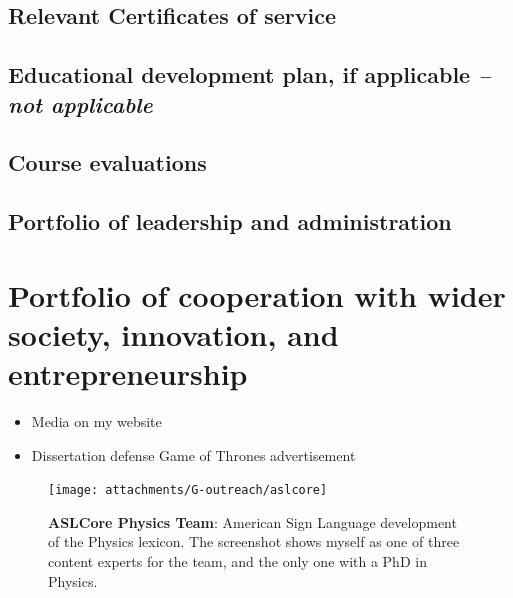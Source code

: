 \section{Relevant Certificates of service \noneyet} \label{sec:relevant-certificates-of-service-noneyet}
\section{Educational development plan, if applicable \normalsize{\textit{-- not applicable}}} \label{sec:educational-development-plan-if-applicable-not-applicable}
\section{Course evaluations} \label{sec:course-evaluations}

\section{Portfolio of leadership and administration} \label{sec:portfolio-of-leadership-and-administration}

\setcounter{chapter}{6}
\chapter{Portfolio of cooperation with wider society, innovation, and entrepreneurship}
\begin{itemize}
	\item Media on my website
	\item Dissertation defense Game of Thrones advertisement
\end{itemize}


\begin{figure}[h!]
	\centering
	\caption{\textbf{ASLCore Physics Team}: American Sign Language development of the Physics lexicon. The screenshot shows myself as one of three content experts for the team, and the only one with a PhD in Physics.}
	\texttt{[image: attachments/G-outreach/aslcore]}
\end{figure}

